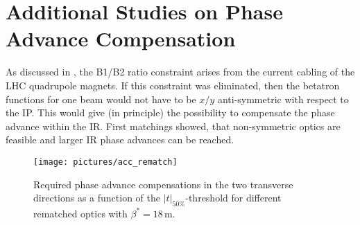 \section{Additional Studies on Phase Advance Compensation}\label{chap:considerations_on_ir2_phase_advance}
As discussed in , the B1/B2 ratio constraint arises from the current cabling of the LHC quadrupole magnets. If this constraint was eliminated, then the betatron functions for one beam would not have to be $x/y$ anti-symmetric with respect to the IP. This would give (in principle) the possibility to compensate the phase advance within the IR. First matchings showed, that non-symmetric optics are feasible and larger IR phase advances can be reached. 
\begin{figure}[b]
\centering
\texttt{[image: pictures/acc\_rematch]}
    \caption{Required phase advance compensations in the two transverse directions as a function of the $|t|_{50\%}$-threshold for different rematched optics with $\beta^*=18\,$m.} 
    \label{fig:threshold_phase}
\end{figure}

